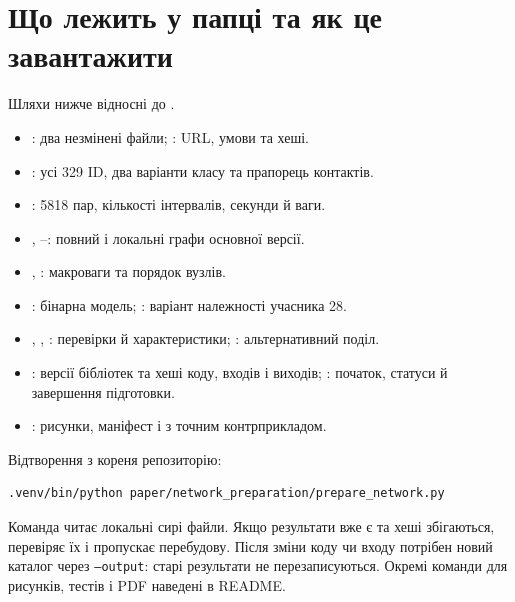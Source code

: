 \documentclass[11pt,a4paper]{article}
\begin{document}
\section{Що лежить у папці та як це завантажити}
Шляхи нижче відносні до .
\begin{itemize}
\item {}: два незмінені файли; : URL, умови та хеші.
\item {}: усі 329 ID, два варіанти класу та прапорець контактів.
\item {}: 5818 пар, кількості інтервалів, секунди й ваги.
\item {}, --: повний і локальні графи основної версії.
\item {}, : макроваги та порядок вузлів.
\item {}: бінарна модель; : варіант належності учасника 28.
\item {}, , : перевірки й характеристики; : альтернативний поділ.
\item {}: версії бібліотек та хеші коду, входів і виходів; : початок, статуси й завершення підготовки.
\item {}: рисунки, маніфест і  з точним контрприкладом.
\end{itemize}

Відтворення з кореня репозиторію:
\begin{verbatim}
.venv/bin/python paper/network_preparation/prepare_network.py
\end{verbatim}
Команда читає локальні сирі файли. Якщо результати вже є та хеші збігаються, перевіряє їх і пропускає перебудову. Після зміни коду чи входу потрібен новий каталог через \texttt{--output}: старі результати не перезаписуються. Окремі команди для рисунків, тестів і PDF наведені в README.
\end{document}
